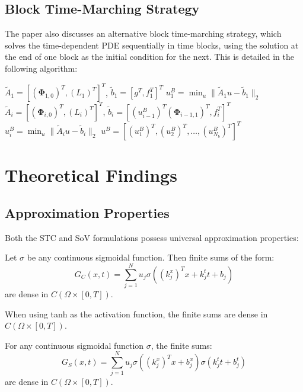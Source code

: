 \documentclass[11pt]{article}
\begin{document}
\subsection{Block Time-Marching Strategy}

The paper also discusses an alternative block time-marching strategy, which solves the time-dependent PDE sequentially in time blocks, using the solution at the end of one block as the initial condition for the next. This is detailed in the following algorithm:

\begin{algorithmic}[1]
\STATE $\tilde{A}_1 = [(\mathbf{\Phi}_{1,0})^T, (L_1)^T]^T$, $\tilde{b}_1 = [g^T, f_1^T]^T$
\STATE $u^B_1 = \min_u \|\tilde{A}_1 u - \tilde{b}_1\|_2$
    \STATE $\tilde{A}_i = [(\mathbf{\Phi}_{i,0})^T, (L_i)^T]^T$, $\tilde{b}_i = [(u^B_{i-1})^T (\mathbf{\Phi}_{i-1,1})^T, f_i^T]^T$
    \STATE $u^B_i = \min_u \|\tilde{A}_i u - \tilde{b}_i\|_2$
\ENDFOR
\STATE $u^B = [(u^B_1)^T, (u^B_2)^T, \ldots, (u^B_{N_b})^T]^T$
\end{algorithmic}

\section{Theoretical Findings}

\subsection{Approximation Properties}

Both the STC and SoV formulations possess universal approximation properties:

\begin{theorem}
Let $\sigma$ be any continuous sigmoidal function. Then finite sums of the form:
\begin{equation}
G_C(x,t) = \sum_{j=1}^{N} u_j \sigma((k^x_j)^T x + k^t_j t + b_j)
\end{equation}
are dense in $C(\Omega \times [0,T])$.
\end{theorem}

\begin{corollary}
When using tanh as the activation function, the finite sums are dense in $C(\Omega \times [0,T])$.
\end{corollary}

\begin{theorem}
For any continuous sigmoidal function $\sigma$, the finite sums:
\begin{equation}
G_S(x,t) = \sum_{j=1}^{N} u_j \sigma((k^x_j)^T x + b^x_j) \sigma(k^t_j t + b^t_j)
\end{equation}
are dense in $C(\Omega \times [0,T])$.
\end{theorem}
\end{document}
